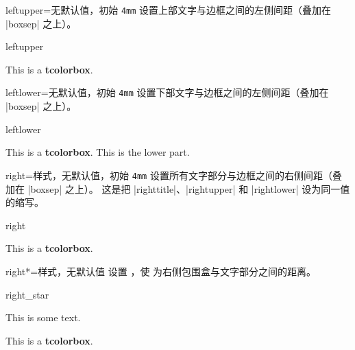 \begin{docTcbKey}{leftupper}{=}{无默认值，初始 \texttt{4mm}}
  设置上部文字与边框之间的左侧间距（叠加在 |boxsep| 之上）。
\begin{exdispExample}{leftupper}

\begin{tcolorbox}[leftupper=3cm,title=My Title]
This is a \textbf{tcolorbox}.
\end{tcolorbox}
\end{exdispExample}
\end{docTcbKey}

\begin{docTcbKey}{leftlower}{=}{无默认值，初始 \texttt{4mm}}
  设置下部文字与边框之间的左侧间距（叠加在 |boxsep| 之上）。
\begin{exdispExample}{leftlower}

\begin{tcolorbox}[leftlower=3cm]
This is a \textbf{tcolorbox}.
\tcblower
This is the lower part.
\end{tcolorbox}
\end{exdispExample}
\end{docTcbKey}

\enlargethispage*{1cm}

\begin{docTcbKey}{right}{=}{样式，无默认值，初始 \texttt{4mm}}
  设置所有文字部分与边框之间的右侧间距（叠加在 |boxsep| 之上）。
  这是把 |righttitle|、|rightupper| 和 |rightlower| 设为同一值的缩写。
\begin{exdispExample}{right}

\begin{tcolorbox}[width=5cm,right=2cm]
This is a \textbf{tcolorbox}.
\end{tcolorbox}
\end{exdispExample}
\end{docTcbKey}

\clearpage

\begin{docTcbKey}[][doc new=2017-02-16]{right*}{=}{样式，无默认值}
  设置 ，使  为右侧包围盒与文字部分之间的距离。
\begin{exdispExample}{right_star}

\flushright This is some text.
\begin{tcolorbox}[grow to right by=5mm,right*=0mm,
  halign=right,enhanced,show bounding box]
This is a \textbf{tcolorbox}.
\end{tcolorbox}
\end{exdispExample}
\end{docTcbKey}



